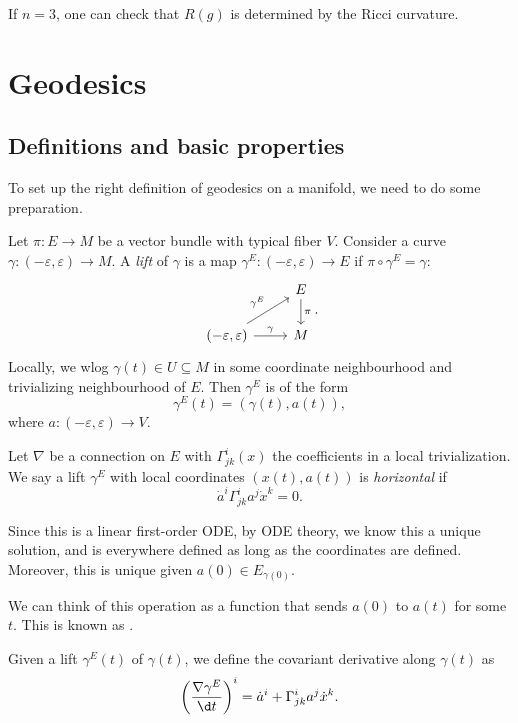 \documentclass[a4paper]{article}
\begin{document}
If $n = 3$, one can check that $R(g)$ is determined by the Ricci curvature.

\section{Geodesics}
\subsection{Definitions and basic properties}
To set up the right definition of geodesics on a manifold, we need to do some preparation.

\begin{defi}[Lift]
  Let $\pi: E \to M$ be a vector bundle with typical fiber $V$. Consider a curve $\gamma: (-\varepsilon, \varepsilon) \to M$. A \emph{lift} of $\gamma$ is a map $\gamma^E: (-\varepsilon, \varepsilon) \to E$ if $\pi \circ \gamma^E = \gamma$:
  \[
    \begin{tikzcd}
      & E \ar[d, "\pi"]\\
      (-\varepsilon, \varepsilon) \ar[r, "\gamma"] \ar[ur, "\gamma^E"] & M
    \end{tikzcd}.
  \]
  Locally, we wlog $\gamma(t) \in U \subseteq M$ in some coordinate neighbourhood and trivializing neighbourhood of $E$. Then $\gamma^E$ is of the form
  \[
    \gamma^E(t) = (\gamma(t), a(t)),
  \]
  where $a: (-\varepsilon, \varepsilon) \to V$.
\end{defi}

\begin{defi}
  Let $\nabla$ be a connection on $E$ with $\Gamma^i_{jk}(x)$ the coefficients in a local trivialization. We say a lift $\gamma^E$ with local coordinates $(x(t), a(t))$ is \emph{horizontal} if
  \[
    \dot{a}^i \Gamma^i_{jk} a^j \dot{x}^k = 0.
  \] %
\end{defi}
Since this is a linear first-order ODE, by ODE theory, we know this a unique solution, and is everywhere defined as long as the coordinates are defined. Moreover, this is unique given $a(0) \in E_{\gamma(0)}$.

We can think of this operation as a function that sends $a(0)$ to $a(t)$ for some $t$. This is known as .

\begin{defi}
  Given a lift $\gamma^E(t)$ of $\gamma(t)$, we define the covariant derivative along $\gamma(t)$ as
  \[
    \left(\frac{\nabla \gamma^E}{\d t}\right)^i = \dot{a}^i + \Gamma^i_{jk} a^j \dot{x}^k.
  \]
\end{defi}
\end{document}
